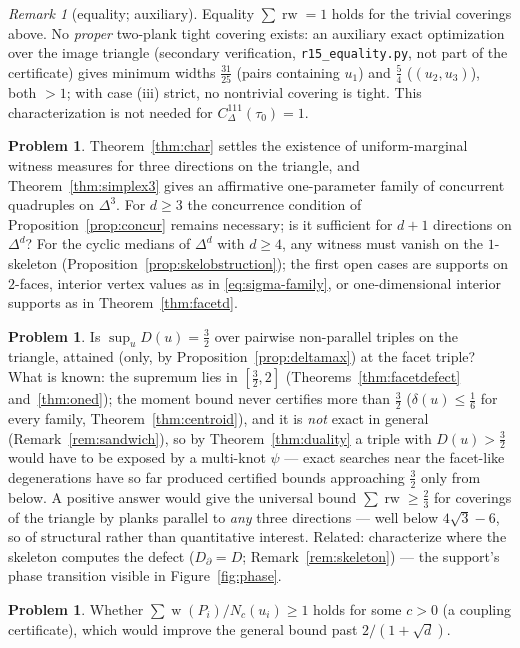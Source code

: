 \documentclass{aims}
\numberwithin{equation}{section}
\theoremstyle{plain}
\theoremstyle{definition}
\newtheorem{problem}[theorem]{Problem}
\theoremstyle{remark}
\newtheorem{remark}[theorem]{Remark}
\newcommand{\rw}{\operatorname{rw}}
\DeclareMathOperator{\wid}{w}
\begin{document}
\begin{remark}[equality; auxiliary]\label{rem:sandwicheq}
Equality $\sum\rw=1$ holds for the trivial coverings above. No \emph{proper}
two-plank tight covering exists: an auxiliary exact optimization over the image
triangle (secondary verification, \texttt{r15\_equality.py}, not part of the
certificate) gives minimum widths $\tfrac{31}{25}$ (pairs containing $u_1$) and
$\tfrac54$ ($(u_2,u_3)$), both $>1$; with case (iii) strict, no nontrivial
covering is tight. This characterization is not needed for
$C^{111}_\Delta(\tau_0)=1$.
\end{remark}

\begin{problem}\label{prob:suff}
Theorem~\ref{thm:char} settles the existence of uniform-marginal witness
measures for three directions on the triangle, and Theorem~\ref{thm:simplex3}
gives an affirmative one-parameter family of concurrent quadruples on
$\Delta^3$. For $d\ge3$ the concurrence condition of
Proposition~\ref{prop:concur} remains necessary; is it sufficient for $d+1$
directions on $\Delta^d$? For the cyclic medians of $\Delta^d$ with $d\ge4$,
any witness must vanish on the $1$-skeleton
(Proposition~\ref{prop:skelobstruction}); the first open cases are supports on
$2$-faces, interior vertex values as in \eqref{eq:sigma-family}, or
one-dimensional interior supports as in Theorem~\ref{thm:facetd}.
\end{problem}
\begin{problem}\label{prob:defect}
Is $\sup_uD(u)=\tfrac32$ over pairwise non-parallel triples on the triangle,
attained (only, by Proposition~\ref{prop:deltamax}) at the facet triple? What
is known: the supremum lies in $[\tfrac32,2]$ (Theorems~\ref{thm:facetdefect}
and~\ref{thm:oned}); the moment bound never certifies more than $\tfrac32$
($\delta(u)\le\tfrac16$ for every family, Theorem~\ref{thm:centroid}), and it
is \emph{not} exact in general (Remark~\ref{rem:sandwich}), so by
Theorem~\ref{thm:duality} a triple with $D(u)>\tfrac32$ would have to be
exposed by a multi-knot $\psi$ --- exact searches near the facet-like
degenerations have so far produced certified bounds approaching $\tfrac32$
only from below. A positive answer would give the universal bound
$\sum\rw\ge\tfrac23$ for coverings of the triangle by planks parallel to
\emph{any} three directions --- well below $4\sqrt3-6$, so of structural
rather than quantitative interest. Related: characterize where the skeleton
computes the defect ($D_\partial=D$; Remark~\ref{rem:skeleton}) --- the
support's phase transition visible in Figure~\ref{fig:phase}.
\end{problem}
\begin{problem}
Whether $\sum\wid(P_i)/N_c(u_i)\ge1$ holds for some $c>0$ (a coupling certificate),
which would improve the general bound past $2/(1+\sqrt d)$.
\end{problem}
\end{document}
